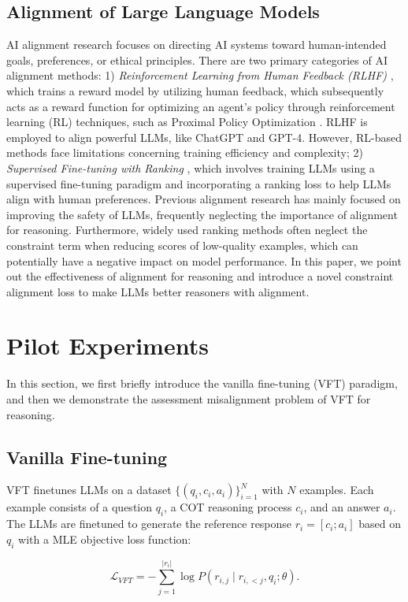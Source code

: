 \subsection{Alignment of Large Language Models} AI alignment research focuses on directing AI systems toward human-intended goals, preferences, or ethical principles. There are two primary categories of AI alignment methods: 1) \textit{Reinforcement Learning from Human Feedback (RLHF)} \citep{instructionGPT}, which trains a reward model by utilizing human feedback, which subsequently acts as a reward function for optimizing an agent's policy through reinforcement learning (RL) techniques, such as Proximal Policy Optimization \citep{ppo}. RLHF is employed to align powerful LLMs, like ChatGPT and GPT-4. However, RL-based methods face limitations concerning training efficiency and complexity; 2) \textit{Supervised Fine-tuning with Ranking} \citep{brio,yuan2023rrhf,song2023preference,dpo}, which involves training LLMs using a supervised fine-tuning paradigm and incorporating a ranking loss to help LLMs align with human preferences. Previous alignment research has mainly focused on improving the safety of LLMs, frequently neglecting the importance of alignment for reasoning. Furthermore, widely used ranking methods often neglect the constraint term when reducing scores of low-quality examples, which can potentially have a negative impact on model performance. In this paper, we point out the effectiveness of alignment for reasoning and introduce a novel constraint alignment loss to make LLMs better reasoners with alignment.

\section{Pilot Experiments}
\label{sec:pilot}
In this section, we first briefly introduce the vanilla fine-tuning (VFT) paradigm, and then we demonstrate the assessment misalignment problem of VFT for reasoning.
\subsection{Vanilla Fine-tuning} VFT finetunes LLMs on a dataset $\{(q_i, c_i, a_i)\}_{i=1}^N$ with $N$ examples. Each example consists of a question $q_i$, a COT reasoning process $c_i$, and an answer $a_i$. The LLMs are finetuned to generate the reference response $r_i=[c_i; a_i]$ based on $q_i$ with a MLE objective loss function:

\begin{equation}
\mathcal{L}_{VFT}=-\sum_{j=1}^{|r_i|} \log P(r_{i,j} \mid r_{i,<j}, q_i;\theta).
\label{eq:mle}
\end{equation}

